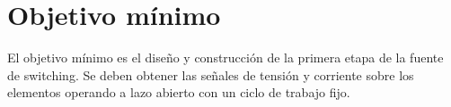 \section{Objetivo mínimo}

El objetivo mínimo es el diseño y construcción de la primera etapa de la fuente de switching. 
Se deben obtener las señales de tensión y corriente sobre los elementos operando a lazo abierto con un ciclo de trabajo fijo. 